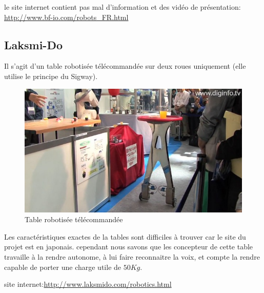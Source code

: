 le site internet contient pas mal d'information et des vidéo de présentation:\\
\url{http://www.bf-io.com/robots_FR.html}

\subsection*{Laksmi-Do} 
Il s'agit d'un table robotisée télécommandée sur deux roues uniquement
(elle utilise le principe du Sigway).

\begin{figure}[h]
\begin{center}
\includegraphics[scale=0.55]{Images/laksmido_table.jpg}
\caption{Table robotisée télécommandée}
\label{Table robotisée télécommandée}
\end{center}
\end{figure} 

Les caractéristiques exactes de la tables sont difficiles à trouver
car le site du projet est en japonais. cependant nous savons que les
concepteur de cette table travaille à la rendre autonome, à lui faire
reconnaitre la voix, et compte la rendre capable de porter une charge
utile de $50Kg$.

site internet:\url{http://www.laksmido.com/robotics.html}
